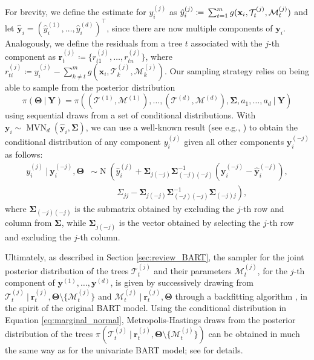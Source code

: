 \documentclass[aoas,preprint]{imsart}
\newcommand\given[1][]{\:#1\vert\:}
\theoremstyle{plain}
\theoremstyle{definition}
\theoremstyle{remark}
\begin{document}
For brevity, we define the estimate for $y_{i}^{(j)}$ as $\hat{y}^{(j)}_{i} \coloneqq \linebreak{}\sum_{t=1}^{m}g(\mathbf{x}_i, \mathcal{T}^{(j)}_{t}, \mathcal{M}^{(j)}_{t})$ and let $\mathbf{\hat{y}}_{i}=(\hat{y}_{i}^{(1)},\ldots,\hat{y}^{(d)}_{i})^{\top}$, since there are now multiple components of $\mathbf{y}_{i}$. Analogously, we define the residuals from a tree $t$ associated with the $j$-th component as $\mathbf{r}^{(j)}_t \coloneqq \{r^{(j)}_{t1}, \ldots, r^{(j)}_{tn}\}$, where $r^{(j)}_{ti} \coloneqq y^{(j)}_{i} - \sum_{k \neq t}^{m}g(\mathbf{x}_{i}, \mathcal{T}^{(j)}_{k}, \mathcal{M}^{(j)}_{k})$. Our sampling strategy relies on being able to sample from the posterior distribution
\[
\pi(\boldsymbol{\Theta}\given \mathbf{Y}) = \pi\left(\left(\boldsymbol{\mathcal{T}}^{(1)},\boldsymbol{\mathcal{M}}^{(1)}\right),\ldots,\left(\boldsymbol{\mathcal{T}}^{(d)},\boldsymbol{\mathcal{M}}^{(d)}\right),\boldsymbol{\Sigma}, a_1,\ldots,a_d\given \mathbf{Y}\right)
\]
using sequential draws from a set of conditional distributions. With 
$\mathbf{y}_i \sim \operatorname{MVN}_d \left(\hat{\mathbf{y}}_i,  \boldsymbol{\Sigma}\right) 
$, we can use a well-known result (see e.g., \citet[Section~5.3]{bierens2004introduction}) to obtain the conditional distribution of any component $y^{(j)}_i$ given all other components $\mathbf{y}_{i}^{(-j)}$ as follows:
\begin{align}
y^{(j)}_i\given \mathbf{y}^{(-j)}_i, \boldsymbol{\Theta} &\sim \operatorname{N} \left(\hat{y}_i^{(j)} + 
\boldsymbol{\Sigma}_{j(-j)} 
\boldsymbol{\Sigma}_{(-j)(-j)}^{-1} \left(\mathbf{y}^{(-j)}_{i} - \hat{\mathbf{y}}_{i}^{(-j)} \right),\right.\nonumber\\ 
\phantom{y^{(j)}_i\given \mathbf{y}^{(-j)}_i, \boldsymbol{\Theta}} & \phantom{\sim \operatorname{N}}\left.\quad\!{\Sigma}_{jj} -  
\boldsymbol{\Sigma}_{j(-j)} 
\boldsymbol{\Sigma}_{(-j)(-j)}^{-1} 
\boldsymbol{\Sigma}_{(-j)j} \right), 
\label{eq:marginal_normal}
\end{align}
where $\boldsymbol{\Sigma}_{(-j)(-j)}$ is the submatrix obtained by excluding the $j$-th row and column from $\boldsymbol{\Sigma}$, while $\boldsymbol{\Sigma}_{j(-j)}$ is the vector obtained by selecting the $j$-th row and excluding the $j$-th column.  
 
Ultimately, as described in Section \ref{sec:review_BART}, the sampler for the joint posterior distribution of the trees $\mathcal{T}^{(j)}_{t}$ and their parameters $\mathcal{M}_{t}^{(j)}$, for the $j$-th component of $\mathbf{y}^{(1)},\ldots,\mathbf{y}^{(d)}$, is given by successively drawing from
$\mathcal{T}^{(j)}_{t} \given  \mathbf{r}^{(j)}_{t},\boldsymbol{\Theta}\setminus\{\mathcal{M}_{t}^{(j)}\}$ and 
$\mathcal{M}^{(j)}_{t} \given \mathbf{r}^{(j)}_{t},\boldsymbol{\Theta}$ through a backfitting algorithm \citep{hastie2000bayesian}, in the spirit of the original BART model. Using the conditional distribution in Equation \eqref{eq:marginal_normal}, Metropolis-Hastings draws from the posterior distribution of the trees $\pi(\mathcal{T}^{(j)}_{t}\given \mathbf{r}_{t}^{(j)}, \boldsymbol{\Theta}\setminus\{\mathcal{M}_{t}^{(j)}\})$ can be obtained in much the same way as for the univariate BART model; see  \citet[Appendix~A]{kapelner2016bartmachine} for details.
\end{document}
